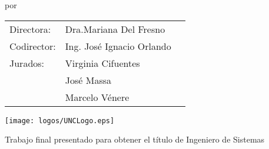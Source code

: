 \begin{titlepage}

\begin{center}

\vspace*{2\bigskipamount}

{\makeatletter
\titlestyle\color{tudelft-dark-blue}\LARGE\@title
\makeatother}

{\makeatletter
\ifx\@subtitle\undefined\else
    \bigskip
    \titlefont\titleshape\LARGE\@subtitle
\fi
\makeatother}

\bigskip
\bigskip

por

\bigskip
\bigskip

{\makeatletter
\titlefont\Large\bfseries\@author
\makeatother}
\vfill
\begin{tabular}{lll}
    Directora: & Dra.Mariana Del Fresno \\
    Codirector: & Ing. José Ignacio Orlando \\
    Jurados:
        & Virginia Cifuentes\\
        & José Massa \\
        & Marcelo Vénere        
\end{tabular}


\bigskip
\bigskip
\bigskip
\bigskip

\texttt{[image: logos/UNCLogo.eps]}
\bigskip
\bigskip


\vfill

Trabajo final presentado para obtener el título de Ingeniero de Sistemas

\bigskip
\bigskip

\bigskip
\bigskip

\bigskip
\bigskip

\end{center}

\end{titlepage}

